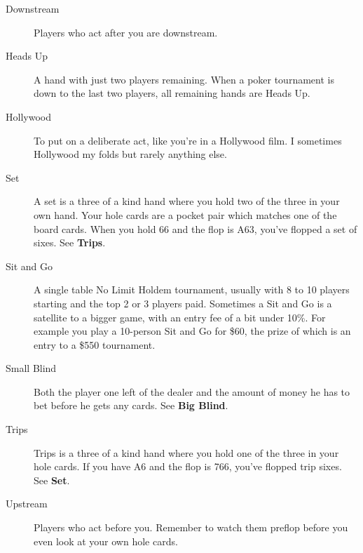 \begin{description}
\item[Downstream] Players who act after you are downstream.

\item[Heads Up] A hand with just two players remaining. When a poker tournament
is down to the last two players, all remaining hands are Heads Up.

\item[Hollywood] To put on a deliberate act, like you're in a Hollywood film. I
sometimes Hollywood my folds but rarely anything else.

\item[Set] A set is a three of a kind hand where you hold two of the three in your
own hand. Your hole cards are a pocket pair which matches one of the board cards.
When you hold 66 and the flop is A63, you've flopped a set of sixes. See \textbf{Trips}.

\item[Sit and Go] A single table No Limit Holdem tournament, usually with 8 to 10
players starting and the top 2 or 3 players paid. Sometimes a Sit and Go is
a satellite to a bigger game, with an entry fee of a bit under 10\%. For
example you play a 10-person Sit and Go for \$60, the prize of which
is an entry to a \$550 tournament.

\item[Small Blind] Both the player one left of the dealer and the amount of money he
has to bet before he gets any cards. See \textbf{Big Blind}.

\item[Trips] Trips is a three of a kind hand where you hold one of the three in your
hole cards. If you have A6 and the flop is 766, you've flopped trip sixes. See \textbf{Set}.

\item[Upstream] Players who act before you. Remember to watch them preflop before 
you even look at your own hole cards.

\end{description}
